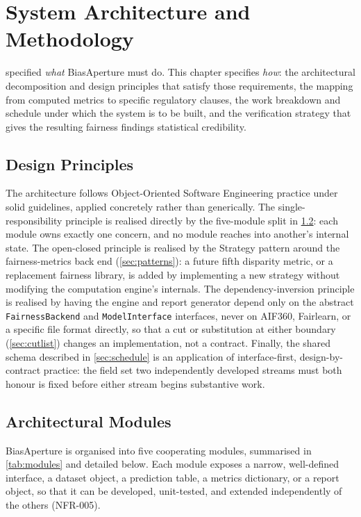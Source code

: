 \chapter{System Architecture and Methodology}
\label{chap:methodology}

 specified \emph{what} BiasAperture must do. This chapter specifies \emph{how}: the architectural decomposition and design principles that satisfy those requirements, the mapping from computed metrics to specific regulatory clauses, the work breakdown and schedule under which the system is to be built, and the verification strategy that gives the resulting fairness findings statistical credibility.

\section{Design Principles}

The architecture follows Object-Oriented Software Engineering practice under \gls{solid} guidelines, applied concretely rather than generically. The single-responsibility principle is realised directly by the five-module split in \cref{sec:modules}: each module owns exactly one concern, and no module reaches into another's internal state. The open-closed principle is realised by the Strategy pattern around the fairness-metrics back end (\cref{sec:patterns}): a future fifth disparity metric, or a replacement fairness library, is added by implementing a new strategy without modifying the computation engine's internals. The dependency-inversion principle is realised by having the engine and report generator depend only on the abstract \texttt{FairnessBackend} and \texttt{ModelInterface} interfaces, never on AIF360, Fairlearn, or a specific file format directly, so that a cut or substitution at either boundary (\cref{sec:cutlist}) changes an implementation, not a contract. Finally, the shared schema described in \cref{sec:schedule} is an application of interface-first, design-by-contract practice: the field set two independently developed streams must both honour is fixed before either stream begins substantive work.

\section{Architectural Modules}
\label{sec:modules}

BiasAperture is organised into five cooperating modules, summarised in \cref{tab:modules} and detailed below. Each module exposes a narrow, well-defined interface, a dataset object, a prediction table, a metrics dictionary, or a report object, so that it can be developed, unit-tested, and extended independently of the others (NFR-005).

